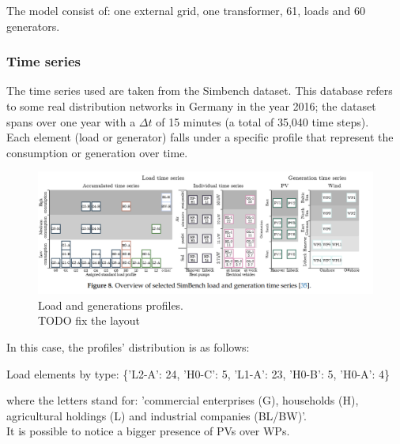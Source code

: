 The model consist of: one external grid, one transformer, 61, loads and 60 generators.

\subsubsection{Time series}
The time series used are taken from the Simbench dataset. This database refers to some real distribution networks in Germany in the year 2016; the dataset spans over one year with a $\Delta t$ of 15 minutes (a total of 35,040 time steps).\\

Each element (load or generator) falls under a specific profile that represent the consumption or generation over time.

\begin{figure}[h]
\centering
    \includegraphics[width=.9\linewidth]{images/MVOberr/Simbench.PNG}
\caption{Load and generations profiles. \\
TODO fix the layout}
\label{fig:gym_anm_net}
\end{figure}

In this case, the profiles' distribution is as follows:

\begin{algorithm}[h]
\State Load elements by type: \{'L2-A': 24, 'H0-C': 5, 'L1-A': 23, 'H0-B': 5, 'H0-A': 4\}

\end{algorithm}
\noindent where the letters stand for: 'commercial enterprises (G), households (H), agricultural holdings (L) and industrial companies (BL/BW)'. \\
It is possible to notice a bigger presence of PVs over WPs.


